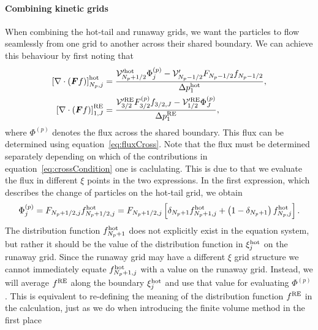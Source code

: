 \documentclass{notes}
\newcommand{\Vp}{\mathcal{V}'}
\begin{document}
    \paragraph{Combining kinetic grids}
    When combining the hot-tail and runaway grids, we want the particles to flow
    seamlessly from one grid to another across their shared boundary. We can
    achieve this behaviour by first noting that
    \begin{equation}\label{eq:crossCondition}
        \begin{aligned}
            \left[ \nabla\cdot\left( \bb{F}f \right)\right]^{\rm hot}_{N_p,j} &=
                \frac{\Vp^{\rm hot}_{N_p+1/2}\Phi^{(p)}_j - \Vp_{N_p-1/2} F_{N_p-1/2}f_{N_p-1/2}}{\Delta p^{\rm hot}_1},\\
            \left[ \nabla\cdot\left( \bb{F}f \right)\right]^{\rm RE}_{1,J} &=
                \frac{\Vp^{\rm RE}_{3/2} F^{(p)}_{3/2} f_{3/2,J} - \Vp^{\rm RE}_{1/2}\Phi^{(p)}_J}{\Delta p^{\rm RE}_1},
        \end{aligned}
    \end{equation}
    where $\Phi^{(p)}$ denotes the flux across the shared boundary. This flux
    can be determined using equation~\eqref{eq:fluxCross}. Note that the flux
    must be determined separately depending on which of the contributions in
    equation~\eqref{eq:crossCondition} one is caclulating. This is due to that
    we evaluate the flux in different $\xi$ points in the two expressions. In
    the first expression, which describes the change of particles on the
    hot-tail grid, we obtain
    \begin{equation}\label{eq:crossFluxP}
        \Phi^{(p)}_j = F_{N_p+1/2,j}f^{\rm hot}_{N_p+1/2,j} =
            F_{N_p+1/2,j}\left[ \delta_{N_p+1}f^{\rm hot}_{N_p+1,j} + \left( 1-\delta_{N_p+1}\right)f^{\rm hot}_{N_p,j} \right].
    \end{equation}
    The distribution function $f^{\rm hot}_{N_p+1}$ does not explicitly exist in
    the equation system, but rather it should be the value of the distribution
    function in $\xi_j^{\rm hot}$ on the runaway grid. Since the runaway grid
    may have a different $\xi$ grid structure we cannot immediately equate
    $f^{\rm hot}_{N_p+1,j}$ with a value on the runaway grid. Instead, we will
    average $f^{\rm RE}$ along the boundary $\xi_j^{\rm hot}$ and use that
    value for evaluating $\Phi^{(p)}$. This is equivalent to re-defining the
    meaning of the distribution function $f^{\rm RE}$ in the calculation, just
    as we do when introducing the finite volume method in the first place
\end{document}
